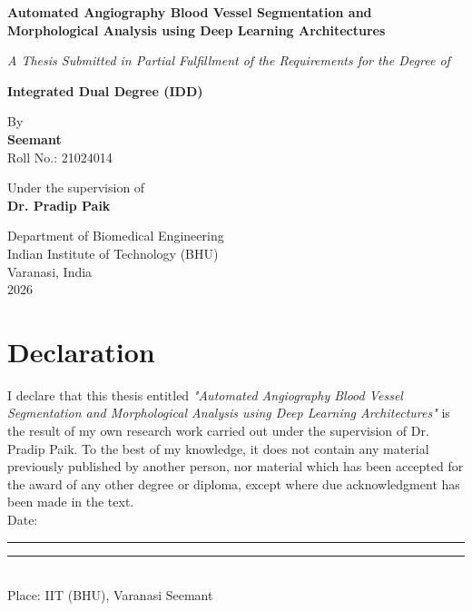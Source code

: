 \documentclass[a4paper, 12pt, oneside]{book}
\begin{document}
\frontmatter

\begin{titlepage}
    \begin{center}
        \vspace*{1cm}
        
        \Huge
        \textbf{Automated Angiography Blood Vessel Segmentation and Morphological Analysis using Deep Learning Architectures}
        
        \vspace{1.5cm}
        
        \Large
        \textit{A Thesis Submitted in Partial Fulfillment of the Requirements for the Degree of}
        
        \vspace{0.5cm}
        \textbf{Integrated Dual Degree (IDD)}
        
        \vspace{2cm}
        
        \Large
        By \\
        \textbf{Seemant} \\
        Roll No.: 21024014 \\
        
        \vspace{2cm}
        
        \Large
        Under the supervision of \\
        \textbf{Dr. Pradip Paik}
        
        \vfill
        
        
        \vspace{1cm}
        
        \Large
        Department of Biomedical Engineering \\
        Indian Institute of Technology (BHU) \\
        Varanasi, India \\
        2026
        
    \end{center}
\end{titlepage}

\chapter*{Declaration}
I declare that this thesis entitled \textit{"Automated Angiography Blood Vessel Segmentation and Morphological Analysis using Deep Learning Architectures"} is the result of my own research work carried out under the supervision of Dr. Pradip Paik. To the best of my knowledge, it does not contain any material previously published by another person, nor material which has been accepted for the award of any other degree or diploma, except where due acknowledgment has been made in the text.
\vspace{2cm}\\
\noindent
Date: \rule{4cm}{0.4pt} \hfill \rule{6cm}{0.4pt}\\
Place: IIT (BHU), Varanasi \hfill Seemant
\end{document}
